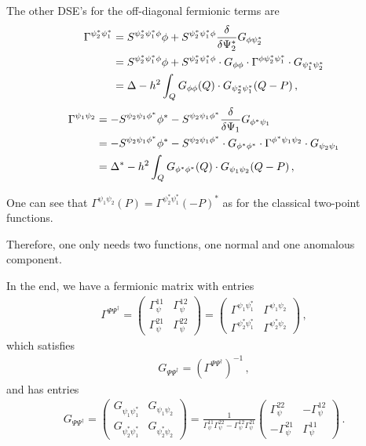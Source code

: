 The other DSE's for the off-diagonal fermionic terms are
\begin{align}
	\Gamma^{\psi_2^*\psi_1^*} &= S^{\psi^*_2\psi^*_1\phi} \phi + S^{\psi^*_2\psi^*_1\phi}
	\frac{\delta}{\delta\Psi_2^*} G_{\phi\psi_2^*} \notag \\
	&= S^{\psi^*_2\psi^*_1\phi} \phi
	+ S^{\psi^*_2\psi^*_1\phi} \cdot G_{\phi\phi} \cdot \Gamma^{\phi\psi^*_2\psi^*_1}
	\cdot G_{\psi^*_1\psi_2^*} \notag \\
	&= \Delta - h^2 \int_Q G_{\phi\phi}(Q)
	\cdot G_{\psi^*_2\psi^*_1}(Q-P) \,,
\end{align}
\begin{align}
	\Gamma^{\psi_1\psi_2} &= - S^{\psi_2\psi_1\phi^*} \phi^* - S^{\psi_2\psi_1\phi^*}
	\frac{\delta}{\delta\Psi_1} G_{\phi^*\psi_1} \notag \\
	&= - S^{\psi_2\psi_1\phi^*} \phi^*
	- S^{\psi_2\psi_1\phi^*} \cdot G_{\phi^*\phi^*} \cdot \Gamma^{\phi^*\psi_1\psi_2}
	\cdot G_{\psi_2\psi_1} \notag \\
	&= \Delta^* - h^2 \int_Q G_{\phi^*\phi^*}(Q)
	\cdot G_{\psi_1\psi_2}(Q-P) \,,
\end{align}

One can see that $\Gamma^{\psi_1\psi_2}(P) = \Gamma^{\psi_2^*\psi_1^*}(-P)^*$ as for the classical two-point functions.

Therefore, one only needs two functions, one normal and one anomalous component.

\clearpage

In the end, we have a fermionic matrix with entries
\begin{align}
	\Gamma^{\Psi\Psi^{\dagger}} =
	\begin{pmatrix}
	\Gamma_{\psi}^{11} & \Gamma_{\psi}^{12} \\
	\Gamma_{\psi}^{21} & \Gamma_{\psi}^{22}
	\end{pmatrix} =
	\begin{pmatrix}
	\Gamma^{\psi_1\psi_1^*} & \Gamma^{\psi_1\psi_2} \\
	\Gamma^{\psi_2^*\psi_1^*} & \Gamma^{\psi_2^*\psi_2}
	\end{pmatrix} \,,
\end{align}
which satisfies
\begin{align}
	G_{\Psi\Psi^{\dagger}} = \left(\Gamma^{\Psi\Psi^{\dagger}}\right)^{-1} \,,
\end{align}
and has entries
\begin{align}
	G_{\Psi\Psi^{\dagger}} =
	\begin{pmatrix}
	G_{\psi_1\psi_1^*} & G_{\psi_1\psi_2} \\
	G_{\psi_2^*\psi_1^*} & G_{\psi_2^*\psi_2}
	\end{pmatrix}
	= \frac{1}{\Gamma_{\psi}^{11}\Gamma_{\psi}^{22}
	-\Gamma_{\psi}^{12}\Gamma_{\psi}^{21}}
	\begin{pmatrix}
	\Gamma_{\psi}^{22} & -\Gamma_{\psi}^{12} \\
	-\Gamma_{\psi}^{21} & \Gamma_{\psi}^{11}
	\end{pmatrix} \,.
\end{align}

